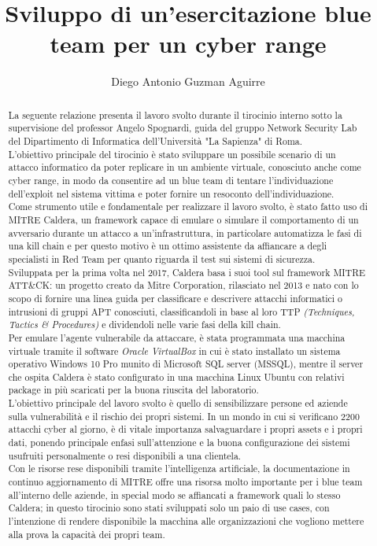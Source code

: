 \documentclass[oneside]{sapthesis}
\title{Sviluppo di un'esercitazione blue team per un cyber range}
\author{Diego Antonio Guzman Aguirre}
\begin{document}
\frontmatter
\maketitle

\begin{abstract}
La seguente relazione presenta il lavoro svolto durante il tirocinio interno sotto la supervisione del professor Angelo Spognardi, guida del gruppo Network Security Lab del Dipartimento di Informatica dell'Università "La Sapienza" di Roma.\\
L'obiettivo principale del tirocinio è stato sviluppare un possibile scenario di un attacco informatico da poter replicare in un ambiente virtuale, conosciuto anche come cyber range, in modo da consentire ad un blue team di tentare l'individuazione dell'exploit nel sistema vittima e poter fornire un resoconto dell'individuazione.\\[1.5em]
Come strumento utile e fondamentale per realizzare il lavoro svolto, è stato fatto uso di MITRE Caldera, un framework capace di emulare o simulare il comportamento di un avversario durante un attacco a un'infrastruttura, in particolare automatizza le fasi di una kill chain e per questo motivo è un ottimo assistente da affiancare a degli specialisti in Red Team per quanto riguarda il test sui sistemi di sicurezza.\\
Sviluppata per la prima volta nel 2017, Caldera basa i suoi tool sul framework MITRE ATT\&CK: un progetto creato da Mitre Corporation, rilasciato nel 2013 e nato con lo scopo di fornire una linea guida per classificare e descrivere attacchi informatici o intrusioni di gruppi APT conosciuti, classificandoli in base al loro TTP \textit{(Techniques, Tactics \& Procedures)} e dividendoli nelle varie fasi della kill chain.\\
Per emulare l'agente vulnerabile da attaccare, è stata programmata una macchina virtuale tramite il software \textit{Oracle VirtualBox} in cui è stato installato un sistema operativo Windows 10 Pro munito di Microsoft SQL server (\textsc{MSSQL}), mentre il server che ospita Caldera è stato configurato in una macchina Linux Ubuntu con relativi package in più scaricati per la buona riuscita del laboratorio.\\[1.5em]
L'obiettivo principale del lavoro svolto è quello di sensibilizzare persone ed aziende sulla vulnerabilità e il rischio dei propri sistemi. In un mondo in cui si verificano 2200 attacchi cyber al giorno, è di vitale importanza salvaguardare i propri assets e i propri dati, ponendo principale enfasi sull'attenzione e la buona configurazione dei sistemi usufruiti personalmente o resi disponibili a una clientela.\\
Con le risorse rese disponibili tramite l'intelligenza artificiale, la documentazione in continuo aggiornamento di MITRE offre una risorsa molto importante per i blue team all'interno delle aziende, in special modo se affiancati a framework quali lo stesso Caldera; in questo tirocinio sono stati sviluppati solo un paio di use cases, con l'intenzione di rendere disponibile la macchina alle organizzazioni che vogliono mettere alla prova la capacità dei propri team.

\end{abstract}
\end{document}
